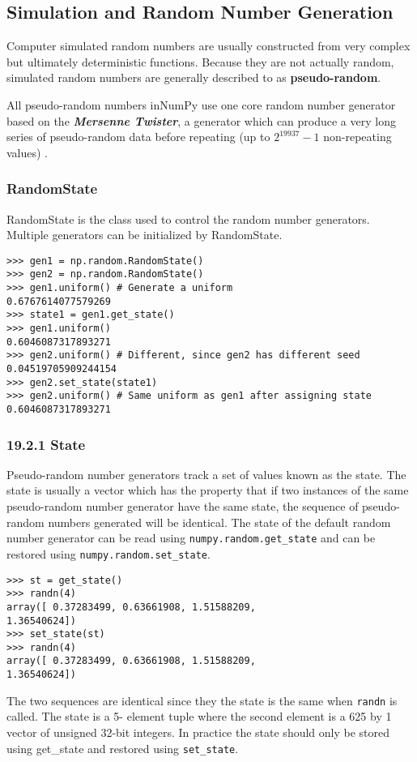 \documentclass[KSmain.tex]{subfiles}
\begin{document}
\subsection{Simulation and Random Number Generation}
Computer simulated random numbers are usually constructed from very complex but ultimately deterministic
functions. Because they are not actually random, simulated random numbers are generally described
to as \textbf{pseudo-random}. 

All pseudo-random numbers inNumPy use one core random number generator
based on the \textbf{\textit{Mersenne Twister}}, a generator which can produce a very long series of pseudo-random
data before repeating (up to $2^19937 - 1$ non-repeating values)
.
\subsubsection{RandomState}
RandomState is the class used to control the random number generators. Multiple generators can be initialized
by RandomState.
\begin{framed}
\begin{verbatim}
>>> gen1 = np.random.RandomState()
>>> gen2 = np.random.RandomState()
>>> gen1.uniform() # Generate a uniform
0.6767614077579269
>>> state1 = gen1.get_state()
>>> gen1.uniform()
0.6046087317893271
>>> gen2.uniform() # Different, since gen2 has different seed
0.04519705909244154
>>> gen2.set_state(state1)
>>> gen2.uniform() # Same uniform as gen1 after assigning state
0.6046087317893271
\end{verbatim}
\end{framed}
\subsubsection{19.2.1 State}
Pseudo-random number generators track a set of values known as the state. The state is usually a vector
which has the property that if two instances of the same pseudo-random number generator have the
same state, the sequence of pseudo-random numbers generated will be identical. The state of the default
random number generator can be read using \texttt{numpy.random.get\_state} and can be restored using
\texttt{numpy.random.set\_state}.
\begin{framed}
\begin{verbatim}>>> st = get_state()
>>> randn(4)
array([ 0.37283499, 0.63661908, 1.51588209,
1.36540624])
>>> set_state(st)
>>> randn(4)
array([ 0.37283499, 0.63661908, 1.51588209,
1.36540624])
\end{verbatim}
\end{framed}
The two sequences are identical since they the state is the same when \texttt{randn} is called. The state is a 5-
element tuple where the second element is a 625 by 1 vector of unsigned 32-bit integers. In practice the
state should only be stored using get\_state and restored using \texttt{set\_state}.
\newpage
\end{document}
